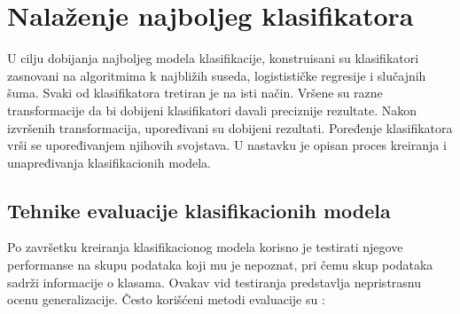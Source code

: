 \documentclass[12pt,oneside]{memoir}
\begin{document}
\section{Nalaženje najboljeg klasifikatora}

U cilju dobijanja najboljeg modela klasifikacije, konstruisani su klasifikatori zasnovani na algoritmima k najbližih suseda, logistističke regresije i slučajnih šuma. Svaki od klasifikatora tretiran je na isti način. %
Vršene su razne transformacije da bi dobijeni klasifikatori davali preciznije rezultate. Nakon izvršenih transformacija, upoređivani su dobijeni rezultati. Poređenje klasifikatora vrši se upoređivanjem njihovih svojstava. U nastavku je opisan proces kreiranja i unapređivanja klasifikacionih modela.  

\subsection{Tehnike evaluacije klasifikacionih modela}

Po završetku kreiranja klasifikacionog modela korisno je testirati njegove performanse na skupu podataka koji mu je nepoznat, pri čemu skup podataka sadrži informacije o klasama. Ovakav vid testiranja predstavlja nepristrasnu ocenu generalizacije. Često korišćeni metodi evaluacije su  \cite{mitic, mladen, UMLFTA}: 
\end{document}
